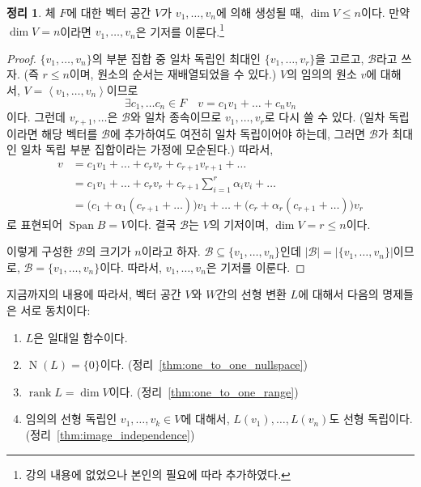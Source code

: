 \documentclass[unfonts,oneside,a4paper]{oblivoir}
\theoremstyle{definition}
\theoremstyle{theorem}
\newtheorem{theorem}{정리}
\theoremstyle{remark}
\theoremstyle{remark}
\theoremstyle{remark}
\theoremstyle{remark}
\renewcommand{\vec}[1]{\bm{\mathit{#1}}}
\newcommand{\vecz}{\bm{\mathrm{0}}}
\DeclareMathOperator{\Span}{Span}
\DeclareMathOperator{\Null}{N}
\DeclareMathOperator{\rank}{rank}
\begin{document}
\begin{theorem} \label{thm:basis_span}
    체 $F$에 대한 벡터 공간 $V$가 $\vec v_1, \dots, \vec v_n$에 의해 생성될 때, $\dim V \leq n$이다.
    만약 $\dim V = n$이라면 $\vec v_1, \dots, \vec v_n$은 기저를 이룬다.\footnote{강의 내용에 없었으나 본인의 필요에 따라 추가하였다.}
\end{theorem}

\begin{proof}
    $\{\vec v_1, \dots, \vec v_n\}$의 부분 집합 중 일차 독립인 최대인 $\{\vec v_1, \dots, \vec v_r\}$을 고르고, $\mathcal B$라고 쓰자.
    (즉 $r \leq n$이며, 원소의 순서는 재배열되었을 수 있다.)
    $V$의 임의의 원소 $\vec v$에 대해서, $V = \left<\vec v_1, \dots, \vec v_n\right>$이므로
    \begin{equation*}
        \exists c_1, \dots c_n \in F \quad \vec v = c_1 \vec v_1 + \dots + c_n \vec v_n
    \end{equation*}
    이다.
    그런데 $\vec v_{r + 1}, \dots$은 $\mathcal B$와 일차 종속이므로 $\vec v_1, \dots, \vec v_r$로 다시 쓸 수 있다.
    (일차 독립이라면 해당 벡터를 $\mathcal B$에 추가하여도 여전히 일차 독립이어야 하는데, 그러면 $\mathcal B$가 최대인 일차 독립 부분 집합이라는 가정에 모순된다.)
    따라서,
    \begin{align*}
        \vec v &= c_1 \vec v_1 + \dots + c_r \vec v_r + c_{r + 1} \vec v_{r + 1} + \dots\\
               &= c_1 \vec v_1 + \dots + c_r \vec v_r + c_{r + 1} \sum_{i = 1}^r \alpha_i \vec v_i + \dots\\
               &= \bigl(c_1 + \alpha_1 (c_{r + 1} + \dots)\bigr) \vec v_1 + \dots + \bigl(c_r + \alpha_r (c_{r + 1} + \dots)\bigr) \vec v_r
    \end{align*}
    로 표현되어 $\Span B = V$이다.
    결국 $\mathcal B$는 $V$의 기저이며, $\dim V = r \leq n$이다.

    이렇게 구성한 $\mathcal B$의 크기가 $n$이라고 하자.
    $\mathcal B \subseteq \{\vec v_1, \dots, \vec v_n\}$인데 $|\mathcal B| = \bigl|\{\vec v_1, \dots, \vec v_n\}\bigr|$이므로, $\mathcal B = \{\vec v_1, \dots, \vec v_n\}$이다.
    따라서, $\vec v_1, \dots, \vec v_n$은 기저를 이룬다.
\end{proof}

지금까지의 내용에 따라서, 벡터 공간 $V$와 $W$간의 선형 변환 $L$에 대해서 다음의 명제들은 서로 동치이다:
\begin{enumerate}
    \item $L$은 일대일 함수이다.
    \item $\Null(L) = \{\vecz\}$이다. (정리~\ref{thm:one_to_one_nullspace})
    \item $\rank L = \dim V$이다. (정리~\ref{thm:one_to_one_range})
    \item 임의의 선형 독립인 $\vec v_1, \dots, \vec v_k \in V$에 대해서, $L(\vec v_1), \dots, L(\vec v_n)$도 선형 독립이다. (정리~\ref{thm:image_independence})
\end{enumerate}
\end{document}
